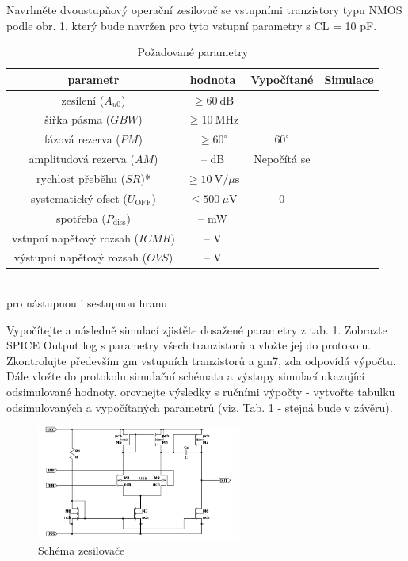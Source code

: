 Navrhněte dvoustupňový operační zesilovač se vstupními tranzistory typu NMOS podle obr. 1, který bude navržen pro tyto vstupní parametry s CL = 10 pF. 

\begin{table}[h]
    \centering
    \caption{Požadované parametry}
    \begin{tabular}{|c|c|c|c|}
        \hline
        \textbf{parametr} & \textbf{hodnota} & \textbf{Vypočítané} & \textbf{Simulace} \\
        \hline
        zesílení ($A_{u0}$) & $\geq 60\ \mathrm{dB}$ & & \\
        \hline
        šířka pásma ($GBW$) & $\geq 10\ \mathrm{MHz}$ & & \\
        \hline
        fázová rezerva ($PM$) & $\geq 60^\circ$ & $60^\circ$ & \\
        \hline
        amplitudová rezerva ($AM$) & -- dB & Nepočítá se & \\
        \hline
        rychlost přeběhu ($SR$)* & $\geq 10\ \mathrm{V}/\mu\mathrm{s}$ & & \\
        \hline
        systematický ofset ($U_{\mathrm{OFF}}$) & $\leq 500\ \mu\mathrm{V}$ & $0$ & \\
        \hline
        spotřeba ($P_{\mathrm{diss}}$) & -- mW & & \\
        \hline
        vstupní napěťový rozsah ($ICMR$) & -- V & & \\
        \hline
        výstupní napěťový rozsah ($OVS$) & -- V & & \\
        \hline
    \end{tabular}
    \\\vspace{1mm}
    \small * pro nástupnou i sestupnou hranu
\end{table}

Vypočítejte a následně simulací zjistěte dosažené parametry z tab. 1. Zobrazte SPICE Output log s parametry všech tranzistorů a vložte jej do protokolu.
Zkontrolujte především gm vstupních tranzistorů a gm7, zda odpovídá výpočtu. 
Dále vložte do protokolu simulační schémata a výstupy simulací ukazující odsimulované hodnoty. 
orovnejte výsledky s ručními výpočty - vytvořte tabulku odsimulovaných a vypočítaných parametrů (viz. Tab. 1 - stejná bude v závěru). 

\vspace{10mm}
\begin{figure}[h!]
    \centering
    \includegraphics[width=0.6\textwidth]{text/img/zadani.png}
    \caption{\label{fig:res-sch} Schéma zesilovače}
\end{figure}

